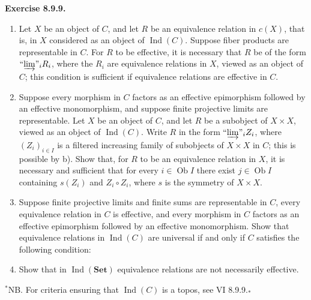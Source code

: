\documentclass[11pt]{article}
\newcommand{\Set}{\mathbf{Set}}
\newcommand{\Ob}{\operatorname{Ob}}
\newcommand{\Ind}{\operatorname{Ind}}
\newcommand{\Sup}{\operatorname{Sup}}
\newcommand{\indlim}{\textrm{``}\!\varinjlim\!\textrm{''}}
\newenvironment{statement}[1]{\par\medskip\noindent\textbf{#1.}\ }{\par\medskip}
\begin{document}
\begin{statement}{Exercise 8.9.9}
\begin{enumerate}[label=\alph*)]
\item Let $X$ be an object of $C$, and let $R$ be an equivalence relation in $c(X)$, that is, in $X$ considered as an object of $\Ind(C)$. Suppose fiber products are representable in $C$. For $R$ to be effective, it is necessary that $R$ be of the form $\indlim_i R_i$, where the $R_i$ are equivalence relations in $X$, viewed as an object of $C$; this condition is sufficient if equivalence relations are effective in $C$.

\item Suppose every morphism in $C$ factors as an effective epimorphism followed by an effective monomorphism, and suppose finite projective limits are representable. Let $X$ be an object of $C$, and let $R$ be a subobject of $X\times X$, viewed as an object of $\Ind(C)$. Write $R$ in the form $\indlim_i Z_i$, where $(Z_i)_{i\in I}$ is a filtered increasing family of subobjects of $X\times X$ in $C$; this is possible by b). Show that, for $R$ to be an equivalence relation in $X$, it is necessary and sufficient that for every $i\in\Ob I$ there exist $j\in\Ob I$ containing $s(Z_i)$ and $Z_i\circ Z_i$, where $s$ is the symmetry of $X\times X$.

\item Suppose finite projective limits and finite sums are representable in $C$, every equivalence relation in $C$ is effective, and every morphism in $C$ factors as an effective epimorphism followed by an effective monomorphism. Show that equivalence relations in $\Ind(C)$ are universal if and only if $C$ satisfies the following condition:

\setcounter{enumi}{10}
\item Show that in $\Ind(\Set)$ equivalence relations are not necessarily effective.
\end{enumerate}

\noindent$^\ast$NB. For criteria ensuring that $\Ind(C)$ is a topos, see VI 8.9.9.$_\ast$
\end{statement}
\end{document}
